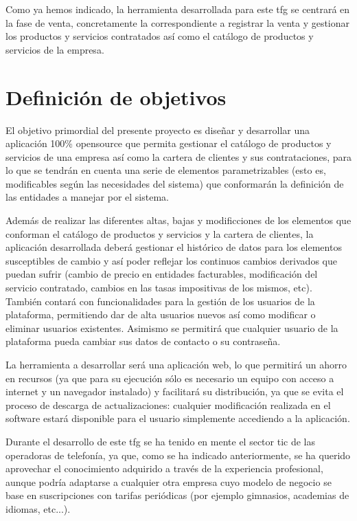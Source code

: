Como ya hemos indicado, la herramienta desarrollada para este \acrshort{tfg} se centrará en la fase de venta, concretamente la correspondiente a registrar la venta y gestionar los productos y servicios contratados así como el catálogo de productos y servicios de la empresa.


\section{Definición de objetivos}
\label{sec:objetivos}


El objetivo primordial del presente proyecto es diseñar y desarrollar una aplicación 100\% \gls{opensource} que permita gestionar el catálogo de productos y servicios de una empresa así como la cartera de clientes y sus contrataciones, para lo que se tendrán en cuenta una serie de elementos parametrizables (esto es, modificables según las necesidades del sistema) que conformarán la definición de las entidades a manejar por el sistema.

Además de realizar las diferentes altas, bajas y modificciones de los elementos que conforman el catálogo de productos y servicios y la cartera de clientes, la aplicación desarrollada deberá gestionar el histórico de datos para los elementos susceptibles de cambio y así poder reflejar los continuos cambios derivados que puedan sufrir (cambio de precio en entidades facturables, modificación del servicio contratado, cambios en las tasas impositivas de los mismos, etc). También contará con funcionalidades para la gestión de los usuarios de la plataforma, permitiendo dar de alta usuarios nuevos así como modificar o eliminar usuarios existentes. Asimismo se permitirá que cualquier usuario de la plataforma pueda cambiar sus datos de contacto o su contraseña.

La herramienta a desarrollar será una aplicación web, lo que permitirá un ahorro en recursos (ya que para su ejecución sólo es necesario un equipo con acceso a internet y un navegador instalado) y facilitará su distribución, ya que se evita el proceso de descarga de actualizaciones: cualquier modificación realizada en el software estará disponible para el usuario simplemente accediendo a la aplicación.

Durante el desarrollo de este \acrshort{tfg} se ha tenido en mente el sector \acrshort{tic} de las operadoras de telefonía, ya que, como se ha indicado anteriormente, se ha querido aprovechar el conocimiento adquirido a través de la experiencia profesional, aunque podría adaptarse a cualquier otra empresa cuyo modelo de negocio se base en suscripciones con tarifas periódicas (por ejemplo gimnasios, academias de idiomas, etc...).


